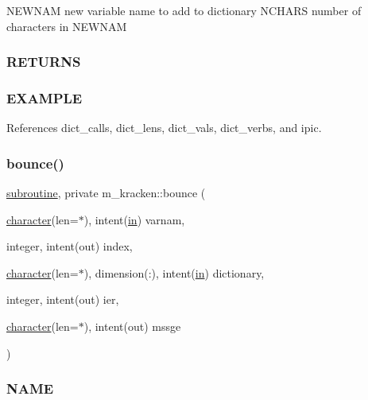 N\+E\+W\+N\+AM new variable name to add to dictionary N\+C\+H\+A\+RS number of characters in N\+E\+W\+N\+AM

\subsubsection*{R\+E\+T\+U\+R\+NS}

\subsubsection*{E\+X\+A\+M\+P\+LE}

References dict\+\_\+calls, dict\+\_\+lens, dict\+\_\+vals, dict\+\_\+verbs, and ipic.

\mbox{\label{namespacem__kracken_af9225957a50e8e0559605911c4c5ee02}} 
\subsubsection{\texorpdfstring{bounce()}{bounce()}}
{\footnotesize\ttfamily \hyperlink{M__stopwatch_83_8txt_acfbcff50169d691ff02d4a123ed70482}{subroutine}, private m\+\_\+kracken\+::bounce (\begin{DoxyParamCaption}\item[{\hyperlink{option__stopwatch_83_8txt_abd4b21fbbd175834027b5224bfe97e66}{character}(len=$\ast$), intent(\hyperlink{M__journal_83_8txt_afce72651d1eed785a2132bee863b2f38}{in})}]{varnam,  }\item[{integer, intent(out)}]{index,  }\item[{\hyperlink{option__stopwatch_83_8txt_abd4b21fbbd175834027b5224bfe97e66}{character}(len=$\ast$), dimension(\+:), intent(\hyperlink{M__journal_83_8txt_afce72651d1eed785a2132bee863b2f38}{in})}]{dictionary,  }\item[{integer, intent(out)}]{ier,  }\item[{\hyperlink{option__stopwatch_83_8txt_abd4b21fbbd175834027b5224bfe97e66}{character}(len=$\ast$), intent(out)}]{mssge }\end{DoxyParamCaption})\hspace{0.3cm}{\ttfamily [private]}}



\subsubsection*{N\+A\+ME}

